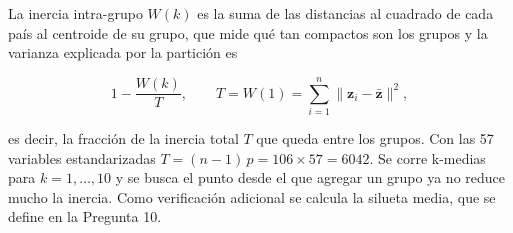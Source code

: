 \documentclass[oneside, openany, fontset=libertinus]{mitthesis}
\begin{document}
La inercia intra-grupo \(W(k)\) es la suma de las distancias al cuadrado
de cada país al centroide de su grupo, que mide qué tan compactos son
los grupos y la varianza explicada por la partición es

\[
1 - \frac{W(k)}{T}, \qquad
T = W(1) = \sum_{i=1}^{n} \lVert \mathbf{z}_i - \bar{\mathbf{z}} \rVert^2,
\]

es decir, la fracción de la inercia total \(T\) que queda entre los
grupos. Con las 57 variables estandarizadas
\(T = (n - 1)\,p = 106 \times 57 = 6042\). Se corre k-medias
\parencite{macqueen1967} para \(k = 1, \dots, 10\) y se busca el punto
desde el que agregar un grupo ya no reduce mucho la inercia. Como
verificación adicional se calcula la silueta media, que se define en la
Pregunta 10.

\Needspace{4.56in}
\end{document}
